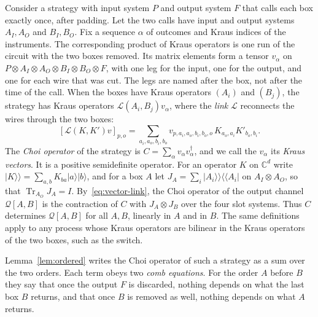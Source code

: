 \documentclass[11pt,letterpaper]{article}
\theoremstyle{definition}\newtheorem{definition}[theorem]{Definition}
\newcommand{\C}{\mathbb C}
\newcommand{\Tr}{\operatorname{Tr}}
\newcommand{\ket}[1]{\lvert#1\rangle}
\newcommand{\vket}[1]{\lvert#1\rangle\!\rangle}
\newcommand{\vbra}[1]{\langle\!\langle#1\rvert}
\newcommand{\QC}{\mathcal Q}
\begin{document}
Consider a strategy with input system $P$ and output system $F$ that
calls each box exactly once, after padding. Let the two calls have input
and output systems $A_I,A_O$ and $B_I,B_O$. Fix a sequence $\alpha$ of
outcomes and Kraus indices of the instruments. The corresponding product
of Kraus operators is one run of the circuit with the two boxes
removed. Its matrix elements form a tensor $v_\alpha$ on
$P\otimes A_I\otimes A_O\otimes B_I\otimes B_O\otimes F$, with one leg
for the input, one for the output, and one for each wire that was cut.
The legs are named after the box, not after the time of the call. When
the boxes have Kraus operators $(A_i)$ and $(B_j)$, the strategy has
Kraus operators $\mathcal L(A_i,B_j)v_\alpha$, where the \emph{link}
$\mathcal L$ reconnects the wires through the two boxes:
\begin{equation}\label{eq:vector-link}
 [\mathcal L(K,K')v]_{p,o}
 =\sum_{a_i,a_o,b_i,b_o}v_{p,a_i,a_o,b_i,b_o,o}\,K_{a_o,a_i}K'_{b_o,b_i}.
\end{equation}
The \emph{Choi operator} of the strategy is
$C=\sum_\alpha v_\alpha v_\alpha^\dagger$, and we call the $v_\alpha$
its \emph{Kraus vectors}. It is a positive semidefinite operator. For
an operator $K$ on $\C^d$ write
$\vket K=\sum_{a,b}K_{ba}\ket a\ket b$, and for a box $A$ let
$J_A=\sum_i\vket{A_i}\vbra{A_i}$ on $A_I\otimes A_O$, so that
$\Tr_{A_O}J_A=I$. By~\eqref{eq:vector-link}, the Choi operator of the
output channel $\QC[A,B]$ is the contraction of $C$ with
$J_A\otimes J_B$ over the four slot systems. Thus $C$ determines
$\QC[A,B]$ for all $A,B$, linearly in $A$ and in $B$. The same
definitions apply to any process whose Kraus operators are bilinear in
the Kraus operators of the two boxes, such as the switch.

Lemma~\ref{lem:ordered} writes the Choi operator of such a
strategy as a sum over the two orders. Each term obeys two \emph{comb equations}. For the order
$A$ before $B$ they say that once the output $F$ is discarded, nothing
depends on what the last box $B$ returns, and that once $B$ is removed
as well, nothing depends on what $A$ returns.
\end{document}
